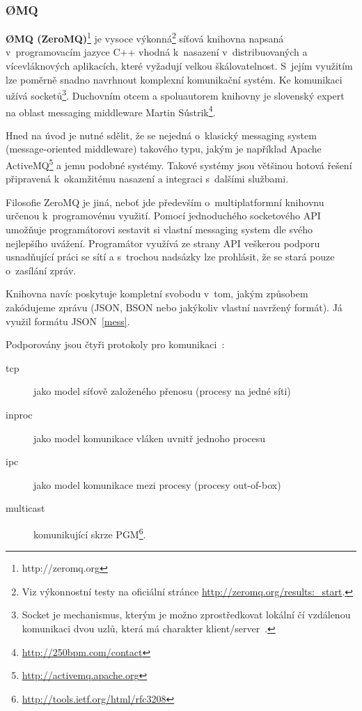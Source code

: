 \documentclass[thesis=M,czech]{FITthesis}[2014/05/07]
\begin{document}
\subsubsection{ØMQ}
\textbf{ØMQ (ZeroMQ)}\footnote{http://zeromq.org} je vysoce výkonná\footnote{Viz výkonnostní testy na oficiální stránce \url{http://zeromq.org/results:_start}.} síťová knihovna napsaná v~programovacím jazyce C++ vhodná k~nasazení v~distribuovaných a vícevláknových aplikacích, které vyžadují velkou škálovatelnost. S~jejím využitím lze poměrně snadno navrhnout komplexní komunikační systém. Ke komunikaci užívá socketů\footnote{Socket je mechanismus, kterým je možno zprostředkovat lokální čí vzdálenou komunikaci dvou uzlů, která má charakter klient/server~\cite{socket}.}. Duchovním otcem a spoluautorem knihovny je slovenský expert na oblast messaging middleware Martin Sústrik\footnote{\url{http://250bpm.com/contact}}.

Hned na úvod je nutné sdělit, že se nejedná o~klasický messaging system (message-oriented middleware) takového typu, jakým je například Apache ActiveMQ\footnote{\url{http://activemq.apache.org}} a jemu podobné systémy. Takové systémy jsou většinou hotová řešení připravená k~okamžitému nasazení a integraci s~dalšími službami. 

Filosofie ZeroMQ je jiná, neboť jde především o~multiplatformní knihovnu určenou k~programovému využití. Pomocí jednoduchého socketového API umožňuje programátorovi sestavit si vlastní messaging system dle svého nejlepšího uvážení. Programátor využívá ze strany API veškerou podporu usnadňující práci se sítí a s~trochou nadsázky lze prohlásit, že se stará pouze o~zasílání zpráv.

Knihovna navíc poskytuje kompletní svobodu v~tom, jakým způsobem zakódujeme zprávu (JSON, BSON nebo jakýkoliv vlastní navržený formát). Já využil formátu JSON~\ref{mess}.

Podporovány jsou čtyři protokoly pro komunikaci~\cite{zeromq1}:

\begin{description}
	\item[tcp] jako model síťově založeného přenosu (procesy na jedné síti)
	\item[inproc] jako model komunikace vláken uvnitř jednoho procesu
	\item[ipc] jako model komunikace mezi procesy (procesy out-of-box)
	\item[multicast]	komunikující skrze PGM\footnote{\url{http://tools.ietf.org/html/rfc3208}}.
\end{description}
\end{document}
